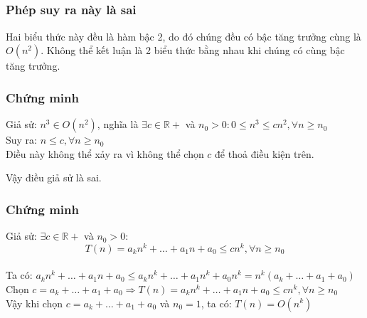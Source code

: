 \subsection{}
\subsubsection{Phép suy ra này là sai}
Hai biểu thức này đều là hàm bậc 2, do đó chúng đều có bậc tăng trưởng cùng là $O(n^2)$. Không thể kết luận là 2 biểu thức bằng nhau khi chúng có cùng bậc tăng trưởng. 
\subsubsection{Chứng minh}
Giả sử: $n^3 \in O(n^2)$, nghĩa là $\exists c \in \mathbb{R+}$ và $n_0 > 0: 0 \leq n^3 \leq cn^2, \forall n \geq n_0$ \\
Suy ra: $n \leq c, \forall n \geq n_0$\\
Điều này không thể xảy ra vì không thể chọn $c$ để thoả điều kiện trên.

Vậy điều giả sử là sai.
\subsubsection{Chứng minh}
Giả sử: $\exists c \in \mathbb{R+}$ và $n_0 > 0:$
$$T(n)=a_k n^k + \dots + a_1 n + a_0 \leq cn^k, \forall n \geq n_0$$\\
Ta có: $a_k n^k + \dots + a_1 n + a_0 \leq a_k n^k + \dots + a_1 n^k + a_0 n^k = n^k (a_k + \dots + a_1 + a_0)$\\
Chọn $c = a_k + \dots + a_1 + a_0 \Rightarrow T(n)=a_k n^k + \dots + a_1 n + a_0 \leq cn^k, \forall n \geq n_0 $\\
Vậy khi chọn $c = a_k + \dots + a_1 + a_0$ và $n_0 = 1$, ta có: $T(n) = O(n^k)$